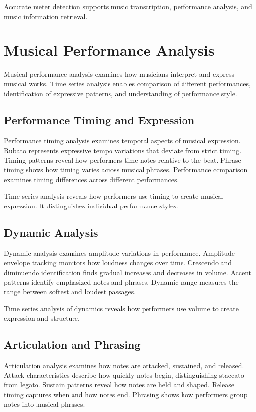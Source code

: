 Accurate meter detection supports music transcription, performance analysis, and music information retrieval.

\section{Musical Performance Analysis}

Musical performance analysis examines how musicians interpret and express musical works. Time series analysis enables comparison of different performances, identification of expressive patterns, and understanding of performance style.

\subsection{Performance Timing and Expression}

Performance timing analysis examines temporal aspects of musical expression. Rubato represents expressive tempo variations that deviate from strict timing. Timing patterns reveal how performers time notes relative to the beat. Phrase timing shows how timing varies across musical phrases. Performance comparison examines timing differences across different performances.

Time series analysis reveals how performers use timing to create musical expression. It distinguishes individual performance styles.

\subsection{Dynamic Analysis}

Dynamic analysis examines amplitude variations in performance. Amplitude envelope tracking monitors how loudness changes over time. Crescendo and diminuendo identification finds gradual increases and decreases in volume. Accent patterns identify emphasized notes and phrases. Dynamic range measures the range between softest and loudest passages.

Time series analysis of dynamics reveals how performers use volume to create expression and structure.

\subsection{Articulation and Phrasing}

Articulation analysis examines how notes are attacked, sustained, and released. Attack characteristics describe how quickly notes begin, distinguishing staccato from legato. Sustain patterns reveal how notes are held and shaped. Release timing captures when and how notes end. Phrasing shows how performers group notes into musical phrases.

